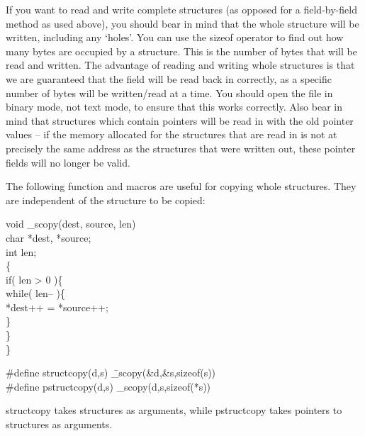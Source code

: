 If you want to read and write complete structures (as opposed for a
field-by-field method as used above), you should bear in mind that
the whole structure will be written, including any `holes'. You can
use the {\cd sizeof} operator to find out how many bytes are occupied
by a structure. This is the number of bytes that will be read and
written. The advantage of reading and writing whole structures is
that we are guaranteed that the field will be read back in correctly,
as a specific number of bytes will be written/read at a time. You
should open the file in binary mode, not text mode, to ensure that
this works correctly. Also bear in mind that structures which contain
pointers will be read in with the old pointer values -- if the memory
allocated for the structures that are read in is not at precisely the
same address as the structures that were written out, these pointer
fields will no longer be valid.

The following function and macros are useful for copying whole
structures. They are independent of the 
structure to be copied:
\begin{code}
void \_scopy(dest, source, len) \\
\> char *dest, *source; \\
\> int len; \\
\{ \+\\
	if(  len > 0  )\{ \+\\
		while( len-- )\{ \+\\
			*dest++ = *source++; \-\\
		\} \-\\
	\} \-\\
\} \addVspace

\#define structcopy(d,s) \tab\tab\=\_scopy(\&d,\&s,sizeof(s)) \\
\#define pstructcopy(d,s)        \>\_scopy(d,s,sizeof(*s))
\end{code}
\noindent
{\cd structcopy} takes structures as arguments, while {\cd
pstructcopy} takes pointers to structures as arguments.

